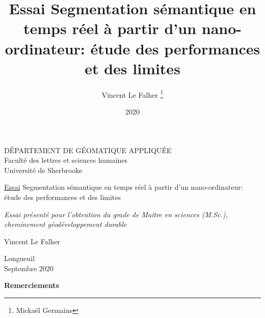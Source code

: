 \documentclass[12pt, letterpaper]{article}
\title{Essai Segmentation sémantique en temps réel à partir d'un nano-ordinateur: étude des performances et des limites}
\author{Vincent Le Falher \thanks{Mickaël Germains}}
\date{2020}
\begin{document}
\begin{titlepage} %
   \centering %
 
   \scshape %
  
   DÉPARTEMENT DE GÉOMATIQUE APPLIQUÉE\\Faculté des lettres et sciences humaines\\Université de Sherbrooke
   
   \vspace{10\baselineskip}
 
   \underline{{\LARGE Essai}}
   \vspace{1\baselineskip}
   \linebreak
   {\LARGE Segmentation sémantique en temps réel à partir d'un nano-ordinateur: étude des performances et des limites}
   \vspace{1\baselineskip}
   \linebreak
 
   \vspace*{3\baselineskip}
 
   \textit{Essai présenté pour l'obtention du grade de Maître en sciences (M.Sc.),\\cheminement géodéveloppement durable}
   
   \vspace{5\baselineskip}
    
   {\LARGE Vincent Le Falher}
     
   \vfill %
 
   Longueuil\\Septembre 2020 %
   \vfill %
   \tiny{}
 
\end{titlepage}

\thispagestyle{empty}

\textbf{Remerciements}


\newpage
\tableofcontents{}
\listoffigures{}
\listoftables{}
\end{document}
